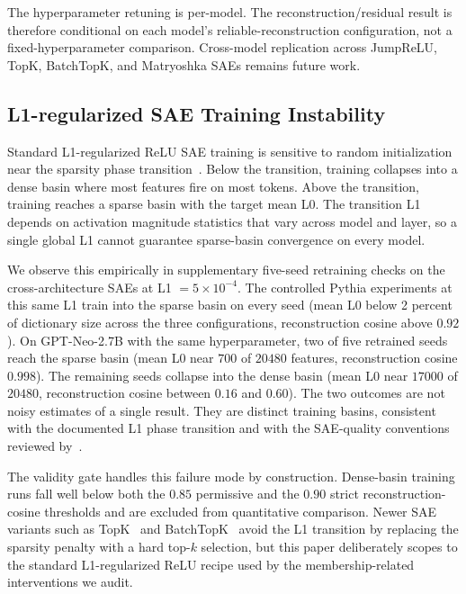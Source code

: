 The hyperparameter retuning is per-model. The reconstruction/residual result is therefore conditional on each model's reliable-reconstruction configuration, not a fixed-hyperparameter comparison. Cross-model replication across JumpReLU, TopK, BatchTopK, and Matryoshka SAEs remains future work.

\subsection{L1-regularized SAE Training Instability}
\label{app:sae_l1_instability}

Standard L1-regularized ReLU SAE training is sensitive to random initialization near the sparsity phase transition~\citep{bricken2023monosemanticity}. Below the transition, training collapses into a dense basin where most features fire on most tokens. Above the transition, training reaches a sparse basin with the target mean L0. The transition L1 depends on activation magnitude statistics that vary across model and layer, so a single global L1 cannot guarantee sparse-basin convergence on every model.

We observe this empirically in supplementary five-seed retraining checks on the cross-architecture SAEs at L1 $= 5 \times 10^{-4}$. The controlled Pythia experiments at this same L1 train into the sparse basin on every seed (mean L0 below 2 percent of dictionary size across the three configurations, reconstruction cosine above $0.92$). On GPT-Neo-2.7B with the same hyperparameter, two of five retrained seeds reach the sparse basin (mean L0 near $700$ of $20480$ features, reconstruction cosine $0.998$). The remaining seeds collapse into the dense basin (mean L0 near $17000$ of $20480$, reconstruction cosine between $0.16$ and $0.60$). The two outcomes are not noisy estimates of a single result. They are distinct training basins, consistent with the documented L1 phase transition and with the SAE-quality conventions reviewed by~\citet{karvonen2025saebench}.

The validity gate handles this failure mode by construction. Dense-basin training runs fall well below both the $0.85$ permissive and the $0.90$ strict reconstruction-cosine thresholds and are excluded from quantitative comparison. Newer SAE variants such as TopK~\citep{gao2025scaling} and BatchTopK~\citep{bussmann2024batchtopk} avoid the L1 transition by replacing the sparsity penalty with a hard top-$k$ selection, but this paper deliberately scopes to the standard L1-regularized ReLU recipe used by the membership-related interventions we audit.

